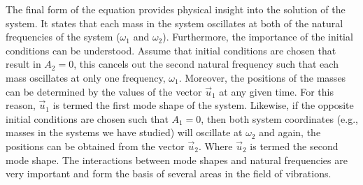 \documentclass[12pt,letter]{article}
\begin{document}
	The final form of the equation provides physical insight into the solution of the system. It states that each mass in the system oscillates at both of the natural frequencies of the system ($\omega_1$ and $\omega_2$). Furthermore, the importance of the initial conditions can be understood. Assume that initial conditions are chosen that result in $A_2=0$, this cancels out the second natural frequency such that each mass oscillates at only one frequency,  $\omega_1$. Moreover, the positions of the masses can be determined by the values of the vector $\vec{u}_1$ at any given time. For this reason,  $\vec{u}_1$ is termed the first mode shape of the system. Likewise, if the opposite initial conditions are chosen such that  $A_1=0$, then both system coordinates (e.g., masses in the systems we have studied) will oscillate at $\omega_2$ and again, the positions can be obtained from the vector $\vec{u}_2$. Where $\vec{u}_2$ is termed the second mode shape. The interactions between mode shapes and natural frequencies are very important and form the basis of several areas in the field of vibrations.
	
\end{document}
